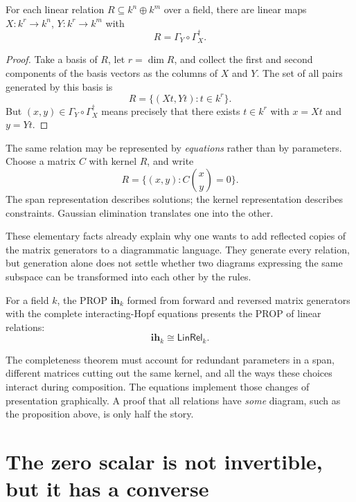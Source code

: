\begin{proposition}
For each linear relation \(R\subseteq k^n\oplus k^m\) over a field, there are linear maps
\(X:k^r\to k^n\), \(Y:k^r\to k^m\) with
\[
 \boxed{R=\Gamma_Y\circ\Gamma_X^\dagger.}
\]
\end{proposition}
\begin{proof}
Take a basis of \(R\), let \(r=\dim R\), and collect the first and second components of the basis vectors as the columns of \(X\) and \(Y\). The set of all pairs generated by this basis is
\[
 R=\{(Xt,Yt):t\in k^r\}.
\]
But \((x,y)\in\Gamma_Y\circ\Gamma_X^\dagger\) means precisely that there exists \(t\in k^r\) with \(x=Xt\) and \(y=Yt\).
\end{proof}

The same relation may be represented by \emph{equations} rather than by parameters. Choose a matrix \(C\) with kernel \(R\), and write
\[
 R=\{(x,y):C\binom{x}{y}=0\}.
\]
The span representation describes solutions; the kernel representation describes constraints. Gaussian elimination translates one into the other.

These elementary facts already explain why one wants to add reflected copies of the matrix generators to a diagrammatic language. They generate every relation, but generation alone does not settle whether two diagrams expressing the same subspace can be transformed into each other by the rules.

\begin{theorem}
For a field \(k\), the PROP \(\mathbf{ih}_k\) formed from forward and reversed matrix generators with the complete interacting-Hopf equations presents the PROP of linear relations:
\[
 \boxed{\mathbf{ih}_k\cong\mathsf{LinRel}_k.}
\]
\end{theorem}

The completeness theorem must account for redundant parameters in a span, different matrices cutting out the same kernel, and all the ways these choices interact during composition. The equations implement those changes of presentation graphically. A proof that all relations have \emph{some} diagram, such as the proposition above, is only half the story.

\section{The zero scalar is not invertible, but it has a converse}

